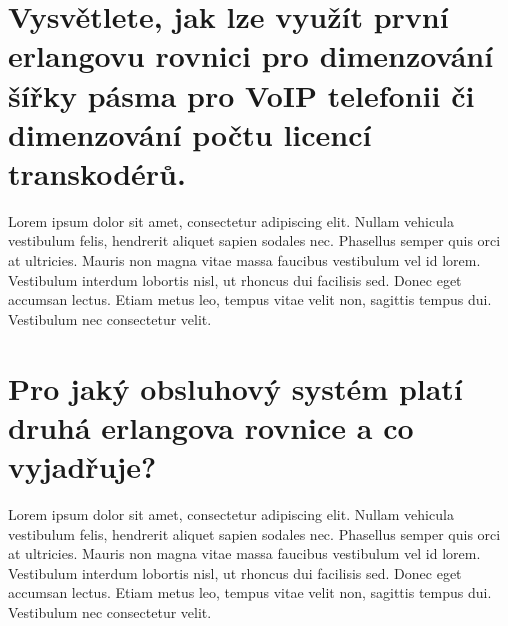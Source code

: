 \section{Vysvětlete, jak lze využít první erlangovu rovnici pro dimenzování šířky pásma pro VoIP telefonii či dimenzování počtu licencí transkodérů.}
Lorem ipsum dolor sit amet, consectetur adipiscing elit. Nullam vehicula vestibulum felis, hendrerit aliquet sapien sodales nec. Phasellus semper quis orci at ultricies. Mauris non magna vitae massa faucibus vestibulum vel id lorem. Vestibulum interdum lobortis nisl, ut rhoncus dui facilisis sed. Donec eget accumsan lectus. Etiam metus leo, tempus vitae velit non, sagittis tempus dui. Vestibulum nec consectetur velit.

\section{Pro jaký obsluhový systém platí druhá erlangova rovnice a co vyjadřuje?}
Lorem ipsum dolor sit amet, consectetur adipiscing elit. Nullam vehicula vestibulum felis, hendrerit aliquet sapien sodales nec. Phasellus semper quis orci at ultricies. Mauris non magna vitae massa faucibus vestibulum vel id lorem. Vestibulum interdum lobortis nisl, ut rhoncus dui facilisis sed. Donec eget accumsan lectus. Etiam metus leo, tempus vitae velit non, sagittis tempus dui. Vestibulum nec consectetur velit.